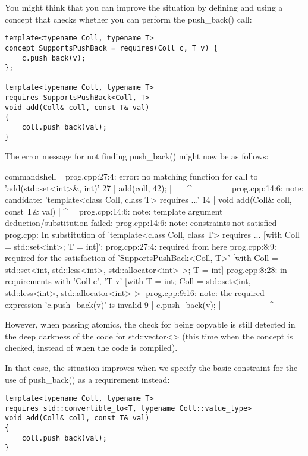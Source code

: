 You might think that you can improve the situation by defining and using a concept that checks whether you can perform the push\_back() call:

\begin{lstlisting}[style=styleCXX]
template<typename Coll, typename T>
concept SupportsPushBack = requires(Coll c, T v) {
	c.push_back(v);
};

template<typename Coll, typename T>
requires SupportsPushBack<Coll, T>
void add(Coll& coll, const T& val)
{
	coll.push_back(val);
}
\end{lstlisting}

The error message for not finding push\_back() might now be as follows:

{\scriptsize
\begin{tcblisting}{commandshell={}}
prog.cpp:27:4: error: no matching function for call to ’add(std::set<int>&, int)’
    27 | add(coll, 42);
        | ~~~^~~~~~~~~~
prog.cpp:14:6: note: candidate: ’template<class Coll, class T> requires ...’
     14 | void add(Coll& coll, const T& val)
         |      ^~~
prog.cpp:14:6: note: template argument deduction/substitution failed:
prog.cpp:14:6: note: constraints not satisfied
prog.cpp: In substitution of ’template<class Coll, class T> requires ...
           [with Coll = std::set<int>; T = int]’:
prog.cpp:27:4: required from here
prog.cpp:8:9: required for the satisfaction of ’SupportsPushBack<Coll, T>’
                  [with Coll = std::set<int, std::less<int>, std::allocator<int> >; T = int]
prog.cpp:8:28: in requirements with ’Coll c’, ’T v’
                      [with T = int; Coll = std::set<int, std::less<int>, std::allocator<int> >]
prog.cpp:9:16: note: the required expression ’c.push_back(v)’ is invalid
      9 | c.push_back(v);
         | ~~~~~~~~~~~^~~
\end{tcblisting}
}

However, when passing atomics, the check for being copyable is still detected in the deep darkness of the code for std::vector<> (this time when the concept is checked, instead of when the code is compiled).

In that case, the situation improves when we specify the basic constraint for the use of push\_back() as a requirement instead:

\begin{lstlisting}[style=styleCXX]
template<typename Coll, typename T>
requires std::convertible_to<T, typename Coll::value_type>
void add(Coll& coll, const T& val)
{
	coll.push_back(val);
}
\end{lstlisting}

